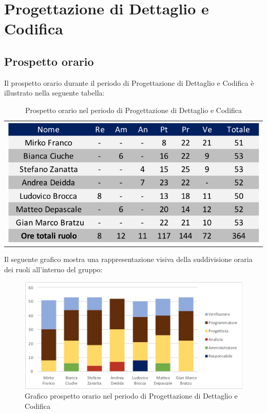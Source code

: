 \section{Progettazione di Dettaglio e Codifica}
\subsection{Prospetto orario}
Il prospetto orario durante il periodo di Progettazione di Dettaglio e Codifica è illustrato nella seguente tabella:

\begin{table}[!ht]
	\begin{center}
		\begin{tabular}{c}
			\includegraphics[scale=0.90]{images/tabellaProgettazioneDettaglioCodifica.png}
		\end{tabular}
		\caption{Prospetto orario nel periodo di Progettazione di Dettaglio e Codifica}
	\end{center}
\end{table}

Il seguente grafico mostra una rappresentazione visiva della suddivisione oraria dei ruoli all'interno del gruppo:
\begin{figure}[!ht]
	\begin{center}
		\includegraphics[scale=0.80]{images/grafoProgettazioneDettaglioCodifica.png}
		\caption{Grafico prospetto orario nel periodo di Progettazione di Dettaglio e Codifica}
	\end{center}
\end{figure}


